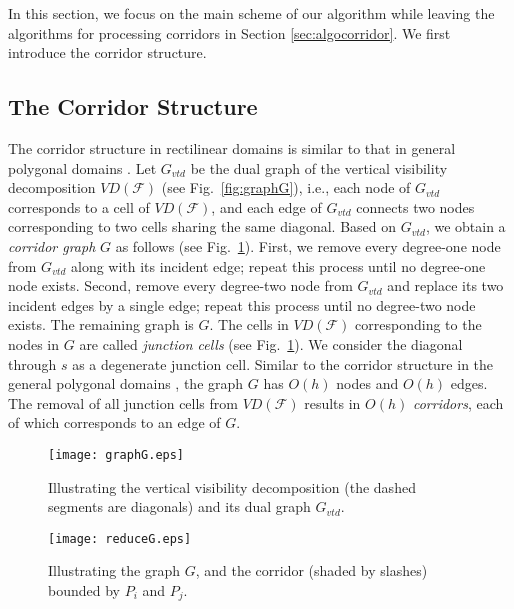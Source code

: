 \documentclass[english,runningheads,11pt]{llncs-revised}
\def\calF{\mathcal{F}}
\newcommand{\vtd}{\mbox{$V\!D$}}
\begin{document}
In this section, we focus on the main scheme of our algorithm while leaving
the algorithms for processing corridors in
Section \ref{sec:algocorridor}. We first introduce the corridor
structure.

\subsection{The Corridor Structure}
\label{sec:corridor}

The corridor structure in rectilinear domains is similar to that
in general polygonal domains \cite{ref:KapoorAn97}.
Let $G_{vtd}$ be the dual graph of the vertical visibility
decomposition $\vtd(\calF)$ (see
Fig.~\ref{fig:graphG}), i.e., each node of
$G_{vtd}$ corresponds to a cell of  $\vtd(\calF)$,
and each edge of $G_{vtd}$ connects two
nodes corresponding to two cells sharing the same diagonal.
Based on $G_{vtd}$, we obtain a {\em corridor graph} $G$ as follows (see
Fig.~\ref{fig:reduceG}). First, we
remove every degree-one node from $G_{vtd}$ along with its incident edge;
repeat this process until no degree-one node exists. Second,
remove every degree-two node from $G_{vtd}$
and replace its two incident edges by a
single edge; repeat this process until no degree-two node exists. The
remaining graph is $G$. The cells in $\vtd(\calF)$ corresponding to the nodes
in $G$ are called {\em junction cells} (see Fig.~\ref{fig:reduceG}).
We consider the diagonal through $s$ as a degenerate junction cell.
Similar to the corridor structure in the
general polygonal domains \cite{ref:KapoorAn97},
the graph $G$ has $O(h)$ nodes and $O(h)$ edges.
The removal of all junction cells from $\vtd(\calF)$ results in $O(h)$
{\em corridors}, each of which corresponds to an edge of $G$.


\begin{figure}[t]
\begin{minipage}[t]{0.49\linewidth}
\begin{center}
\texttt{[image: graphG.eps]}
\caption{\footnotesize Illustrating the vertical visibility
decomposition (the
dashed segments are diagonals) and its dual graph $G_{vtd}$. }
\label{fig:graphG}
\end{center}
\end{minipage}
\hspace{0.02in}
\begin{minipage}[t]{0.49\linewidth}
\begin{center}
\texttt{[image: reduceG.eps]}
\caption{\footnotesize Illustrating the graph $G$,
and the corridor (shaded by slashes)
bounded by $P_i$ and $P_j$.
}
\label{fig:reduceG}
\end{center}
\end{minipage}
\end{figure}
\end{document}
